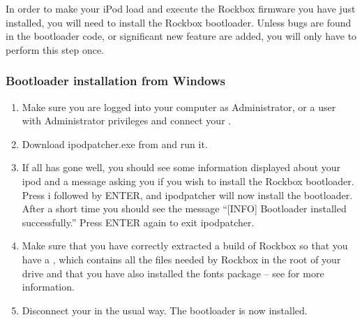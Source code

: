 

In order to make your iPod load and execute the Rockbox firmware you
have just installed, you will need to install the Rockbox
bootloader. Unless bugs are found in the bootloader code, or
significant new feature are added, you will only have to perform this
step once.

\subsubsection{Bootloader installation from Windows}

\begin{enumerate}

\item Make sure you are logged into your computer as Administrator, or a 
user with Administrator privileges and connect your \dap{}.

\item Download ipodpatcher.exe from 
and run it.

\item If all has gone well, you should see some information displayed about
your ipod and a message asking you if you wish to install the Rockbox
bootloader. Press i followed by ENTER, and ipodpatcher will now
install the bootloader. After a short time you should see the message
``[INFO] Bootloader installed successfully.'' Press ENTER again to exit
ipodpatcher.

\item Make sure that you have correctly extracted a build of Rockbox so that
you have a , which contains all the files needed by Rockbox
in the root of your \daps{} drive and that you have also installed the fonts
package -- see  for more information.

\item Disconnect your \dap{} in the usual way. The bootloader is now installed. 

\end{enumerate}

